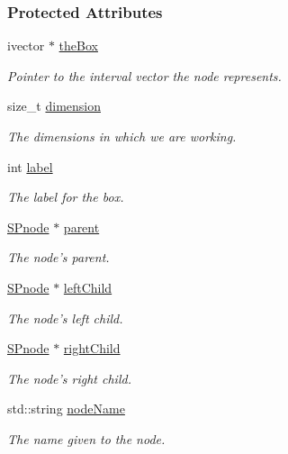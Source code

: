 \subsubsection*{\-Protected \-Attributes}
\begin{DoxyCompactItemize}
\item 
ivector $\ast$ \hyperlink{classsubpavings_1_1SPnode_a2c09d2f687401550468bad6a6dae9832}{the\-Box}
\begin{DoxyCompactList}\small\item\em \-Pointer to the interval vector the node represents. \end{DoxyCompactList}\item 
size\-\_\-t \hyperlink{classsubpavings_1_1SPnode_ac28ce64cdc1aed5e545659699a38c16e}{dimension}
\begin{DoxyCompactList}\small\item\em \-The dimensions in which we are working. \end{DoxyCompactList}\item 
int \hyperlink{classsubpavings_1_1SPnode_a4add69f42780515a4f817f02770e38cb}{label}
\begin{DoxyCompactList}\small\item\em \-The label for the box. \end{DoxyCompactList}\item 
\hyperlink{classsubpavings_1_1SPnode}{\-S\-Pnode} $\ast$ \hyperlink{classsubpavings_1_1SPnode_ad39c8dad1a8fa89110da4bad250521d8}{parent}
\begin{DoxyCompactList}\small\item\em \-The node's parent. \end{DoxyCompactList}\item 
\hyperlink{classsubpavings_1_1SPnode}{\-S\-Pnode} $\ast$ \hyperlink{classsubpavings_1_1SPnode_a5c047856140d3143bec18abc584c2646}{left\-Child}
\begin{DoxyCompactList}\small\item\em \-The node's left child. \end{DoxyCompactList}\item 
\hyperlink{classsubpavings_1_1SPnode}{\-S\-Pnode} $\ast$ \hyperlink{classsubpavings_1_1SPnode_a4d5e29412292750e36196b55e186b6dd}{right\-Child}
\begin{DoxyCompactList}\small\item\em \-The node's right child. \end{DoxyCompactList}\item 
std\-::string \hyperlink{classsubpavings_1_1SPnode_a90803dc066d955d4aec89c00879ff610}{node\-Name}
\begin{DoxyCompactList}\small\item\em \-The name given to the node. \end{DoxyCompactList}\end{DoxyCompactItemize}
